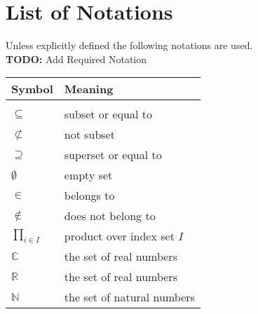 \chapter*{List of Notations}
Unless explicitly defined the following notations are used.\\
\textbf{TODO:} Add Required Notation \\

\begin{tabular}{p{2cm}p{5cm}}
\textbf{Symbol} & \textbf{Meaning}\\
\hline
& \\
$\subseteq$ & subset or equal to \\%
$\not\subset$ & not subset\\%
$\supseteq$ & superset or equal to \\
$\emptyset$ & empty set\\%
$\in$ & belongs to\\%
$\not \in $ & does not belong to \\
$\displaystyle\prod_{i \in I}$ & product over index set $I$ \\
$\mathbb{C}$ & the set of real numbers\\%
$\mathbb{R}$ & the set of real numbers\\%
$\mathbb{N}$ & the set of natural numbers\\%
\end{tabular}

